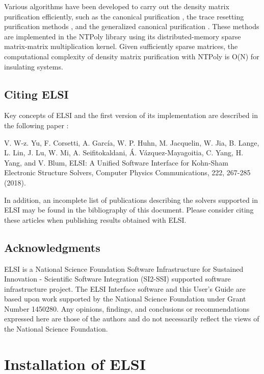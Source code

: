 \documentclass{report}
\begin{document}
Various algorithms have been developed to carry out the density matrix purification efficiently, such as the canonical purification \cite{purification_palser_1998}, the trace resetting purification methods \cite{purification_niklasson_2002}, and the generalized canonical purification \cite{purification_truflandier_2016}. These methods are implemented in the NTPoly library \cite{ntpoly_dawson_2018} using its distributed-memory sparse matrix-matrix multiplication kernel. Given sufficiently sparse matrices, the computational complexity of density matrix purification with NTPoly is O(N) for insulating systems.

\section{Citing ELSI}
\label{sec:cite}
Key concepts of ELSI and the first version of its implementation are described in the following paper \cite{elsi_yu_2018}:

V. W-z. Yu, F. Corsetti, A. Garc\'{i}a, W. P. Huhn, M. Jacquelin, W. Jia, B. Lange, L. Lin, J. Lu, W. Mi, A. Seifitokaldani, \'{A}. V\'{a}zquez-Mayagoitia, C. Yang, H. Yang, and V. Blum, ELSI: A Unified Software Interface for Kohn-Sham Electronic Structure Solvers, Computer Physics Communications, 222, 267-285 (2018).

In addition, an incomplete list of publications describing the solvers supported in ELSI may be found in the bibliography of this document. Please consider citing these articles when publishing results obtained with ELSI.

\section{Acknowledgments}
\label{sec:thanks}
ELSI is a National Science Foundation Software Infrastructure for Sustained Innovation - Scientific Software Integration (SI2-SSI) supported software infrastructure project. The ELSI Interface software and this User's Guide are based upon work supported by the National Science Foundation under Grant Number 1450280. Any opinions, findings, and conclusions or recommendations expressed here are those of the authors and do not necessarily reflect the views of the National Science Foundation.

\chapter{Installation of ELSI}
\end{document}
